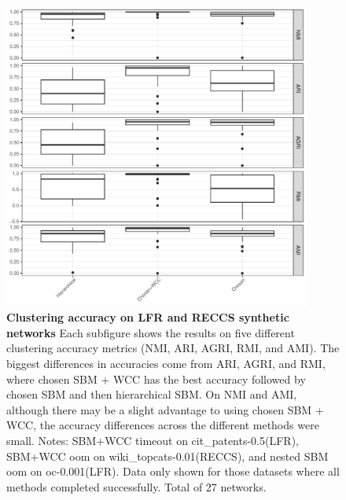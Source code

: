 \documentclass[aps,pre,superscriptaddress]{article}
\begin{document}
\begin{figure}[!htpb]
	\centering
	\includegraphics[width=0.9\textwidth]{figures/accuracy_box.pdf}
	\caption[]{\textbf{Clustering accuracy on LFR and RECCS synthetic networks}  Each subfigure shows the results on five different clustering accuracy metrics (NMI, ARI, AGRI, RMI, and AMI). The biggest differences in accuracies come from ARI, AGRI, and RMI, where chosen SBM + WCC has the best accuracy followed by chosen SBM and then hierarchical SBM. On NMI and AMI, although there may be a slight advantage to using chosen SBM + WCC, the accuracy differences across the different methods were small. Notes: SBM+WCC timeout on cit\_patents-0.5(LFR), SBM+WCC oom on wiki\_topcats-0.01(RECCS), and nested SBM oom on oc-0.001(LFR). Data only shown for those datasets where all methods completed successfully. Total of 27 networks.}
	\label{fig:synthetic-accuracy}
\end{figure}
\end{document}
